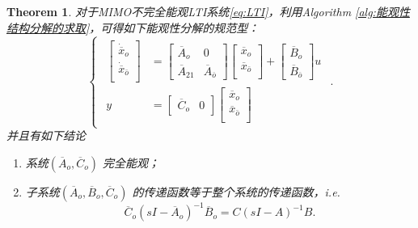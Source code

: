 \documentclass[14pt,a4paper]{article}
\theoremstyle{plain}
\newtheorem{thm}{Theorem}[section]
\theoremstyle{definition}
\theoremstyle{remark}
\theoremstyle{plain}
\theoremstyle{plain}
\theoremstyle{plain}
\theoremstyle{definition}
\theoremstyle{remark}
\numberwithin{equation}{section}
\begin{document}
				\begin{thm}  
				\label{the:882}
				对于MIMO不完全能观LTI系统\eqref{eq:LTI}，利用Algorithm \ref{alg:能观性结构分解的求取}，可得如下能观性分解的规范型：
				\begin{equation}
				\label{eq:obsv_decmp}
					\begin{cases}
						\begin{aligned}
							\begin{bmatrix}
								\dot{\overline{x}}_o\\
								\dot{\overline{x}}_{\bar o}\\
							\end{bmatrix} &= \begin{bmatrix}
							\overline{A}_o & 0\\ 
							\overline{A}_{21} & \overline{A}_{\overline{o}}
							\end{bmatrix}  
							\begin{bmatrix}
								{\overline{x}}_o\\
								{\overline{x}}_{\bar o}\\
							\end{bmatrix} + \begin{bmatrix}
								\overline{B}_o \\
								\overline{B}_{\overline{o}}	
							\end{bmatrix} u \\ 
							y &= \begin{bmatrix}
								\overline{C}_o & 0 
							\end{bmatrix} 
							\begin{bmatrix}
								{\overline{x}}_o\\
								{\overline{x}}_{\bar o}\\
							\end{bmatrix} 
						\end{aligned}  
					\end{cases} 
				.\end{equation}
				并且有如下结论 
				\begin{enumerate}[(1)]
					\item 系统$\left( \overline{A}_o, \overline{C}_o \right) $ 完全能观；
					\item 子系统$\left( \overline{A}_o, \overline{B}_o, \overline{C}_o \right)$ 的传递函数等于整个系统的传递函数，i.e. 
						\[
							\overline{C}_o \left( sI - \overline{A}_o \right)^{-1} \overline{B}_o = C(sI-A)^{-1}B
						.\] 
				\end{enumerate} 
				\end{thm}
\end{document}
